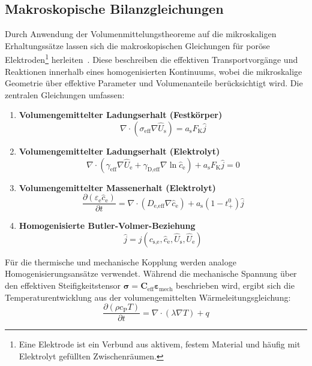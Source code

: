\subsection{\label{sec:macro_balance_equations}Makroskopische Bilanzgleichungen}

Durch Anwendung der Volumenmittelungstheoreme auf die mikroskaligen Erhaltungssätze lassen sich die makroskopischen Gleichungen für poröse Elektroden\footnote{Eine Elektrode ist ein Verbund aus aktivem, festem Material und häufig mit Elektrolyt gefüllten Zwischenräumen.} herleiten~\cite{Doyle1995}. Diese beschreiben die effektiven Transportvorgänge und Reaktionen innerhalb eines homogenisierten Kontinuums, wobei die mikroskalige Geometrie über effektive Parameter und Volumenanteile berücksichtigt wird. Die zentralen Gleichungen umfassen:

\begin{enumerate}
    \item \textbf{Volumengemittelter Ladungserhalt (Festkörper)}
    \begin{equation}
        \nabla \cdot \left(\sigma_{\text{eff}} \nabla \hat{U}_{\text{s}} \right) = a_{\text{s}} F_{\text{K}} \hat{j}
    \end{equation}
    \item \textbf{Volumengemittelter Ladungserhalt (Elektrolyt)}
    \begin{equation}
        \nabla \cdot \left(\gamma_{\text{eff}} \nabla \hat{U}_{\text{e}} + \gamma_{\text{D,eff}} \nabla \ln \hat{c}_{\text{e}}\right) + a_{\text{s}} F_{\text{K}} \hat{j} = 0
    \end{equation}
    \item \textbf{Volumengemittelter Massenerhalt (Elektrolyt)}
    \begin{equation}
        \frac{\partial \left(\varepsilon_{\text{e}} \hat{c}_{\text{e}} \right)}{\partial t} = \nabla \cdot \left(D_{\text{e,eff}}\nabla\hat{c}_{\text{e}}\right) + a_{\text{s}} (1-t^0_+) \hat{j}
    \end{equation}
    \item \textbf{Homogenisierte Butler-Volmer-Beziehung}
    \begin{equation}
        \hat{j} = j(c_{\text{s,e}},\hat{c}_{\text{e}},\hat{U}_{\text{s}},\hat{U}_{\text{e}})
    \end{equation}
\end{enumerate}

Für die thermische und mechanische Kopplung werden analoge Homogenisierungsansätze verwendet. Während die mechanische Spannung über den effektiven Steifigkeitstensor $\boldsymbol{\sigma} = \boldsymbol{C}_{\text{eff}} \boldsymbol{\varepsilon}_{\text{mech}}$ beschrieben wird, ergibt sich die Temperaturentwicklung aus der volumengemittelten Wärmeleitungsgleichung:
\begin{equation}
    \frac{\partial (\rho c_{\text{P}} T)}{\partial t} = \nabla \cdot (\lambda \nabla T) + q
\end{equation}

